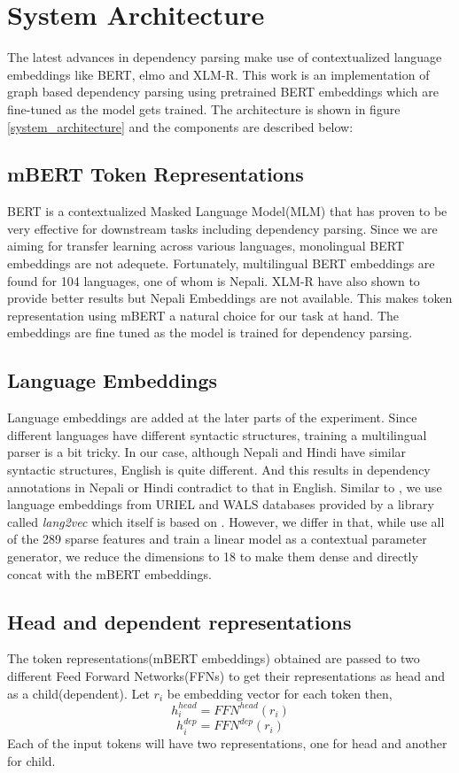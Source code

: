 \section{System Architecture}
The latest advances in dependency parsing make use of contextualized language
embeddings like BERT, elmo and XLM-R. This work is an implementation of graph
based dependency parsing using pretrained BERT embeddings which are fine-tuned
as the model gets trained. The architecture is shown in figure
\ref{system_architecture} and the components are described below:

\subsection{mBERT Token Representations}
BERT is a contextualized Masked Language Model(MLM) that has proven to be very
effective for downstream tasks including dependency parsing. Since we are
aiming for transfer learning across various languages, monolingual BERT
embeddings are not adequete. Fortunately, multilingual BERT embeddings are
found for 104 languages, one of whom is Nepali. XLM-R have also shown to
provide better results but Nepali Embeddings are not available.  This makes
token representation using mBERT a natural choice for our task at hand.
The embeddings are fine tuned as the model is trained for dependency parsing.

\subsection{Language Embeddings}
Language embeddings are added at the later parts of the experiment. Since
different languages have different syntactic structures, training a
multilingual parser is a bit tricky. In our case, although Nepali and Hindi
have similar syntactic structures, English is quite different. And this results
in dependency annotations in Nepali or Hindi contradict to that in
English. Similar to \cite{udapter}, we use language embeddings from URIEL and
WALS databases provided by a library called \textit{lang2vec} which itself is
based on \cite{lang2vec}. However, we differ in that, while \cite{udapter} use
all of the 289 sparse features and train a linear model as a contextual
parameter generator, we reduce the dimensions to 18 to make them dense and
directly concat with the mBERT embeddings.

\subsection{Head and dependent representations}
The token representations(mBERT embeddings) obtained are passed to two
different Feed Forward Networks(FFNs) to get their representations as head and
as a child(dependent). Let $r_i$ be embedding vector for each token then,
$$h_i^{head} = FFN^{head}(r_i)$$
$$h_i^{dep} = FFN^{dep}(r_i)$$
Each of the input tokens will have two representations, one for head and another for child.

